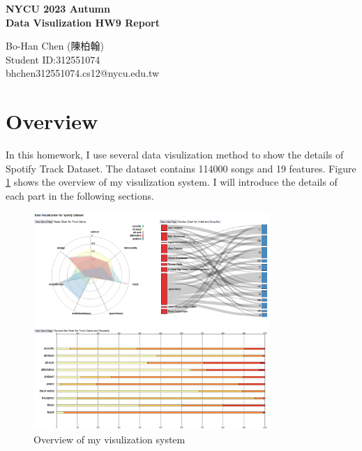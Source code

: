 \documentclass[a4paper, oneside, final, 12pt]{scrartcl} %
\begin{document}


\begin{center}
    {\fontsize{18}{30}\textbf{NYCU 2023 Autumn \\ Data Visulization HW9 Report}} \\
\end{center}

\begin{center}
  Bo-Han Chen (陳柏翰) \\
  Student ID:312551074 \\
  bhchen312551074.cs12@nycu.edu.tw
\end{center}

\section{Overview}

In this homework, I use several data visulization method to show the details of
Spotify Track Dataset. The dataset contains 114000 songs and 19 features.
Figure \ref{fig: overview} shows the overview of my visulization system.
I will introduce the details of each part in the following sections.

\begin{figure}[h]
  \centering
  \includegraphics[width=0.8\textwidth]{Images/overview.png}
  \caption{Overview of my visulization system}
  \label{fig: overview}
\end{figure}
\end{document}
